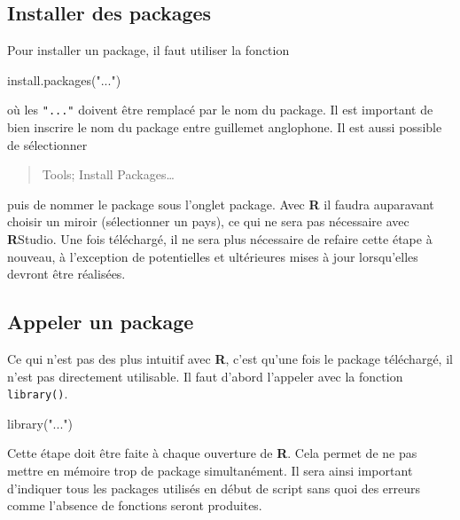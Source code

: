 \documentclass[
]{book}
\newenvironment{Shaded}{}{}
\newcommand{\FunctionTok}[1]{#1}
\newcommand{\NormalTok}[1]{#1}
\newcommand{\StringTok}[1]{#1}
\begin{document}
\hypertarget{installer-des-packages}{%
\subsection{Installer des packages}\label{installer-des-packages}}

Pour installer un package, il faut utiliser la fonction

\begin{Shaded}
\begin{Highlighting}[]
\FunctionTok{install.packages}\NormalTok{(}\StringTok{"..."}\NormalTok{)}
\end{Highlighting}
\end{Shaded}

où les \texttt{"..."} doivent être remplacé par le nom du package. Il est important de bien inscrire le nom du package entre guillemet anglophone. Il est aussi possible de sélectionner

\begin{quote}
Tools;
Install Packages\ldots{}
\end{quote}

puis de nommer le package sous l'onglet package. Avec \textbf{R} il faudra auparavant choisir un miroir (sélectionner un pays), ce qui ne sera pas nécessaire avec \textbf{R}Studio. Une fois téléchargé, il ne sera plus nécessaire de refaire cette étape à nouveau, à l'exception de potentielles et ultérieures mises à jour lorsqu'elles devront être réalisées.

\hypertarget{appeler-un-package}{%
\subsection{Appeler un package}\label{appeler-un-package}}

Ce qui n'est pas des plus intuitif avec \textbf{R}, c'est qu'une fois le package téléchargé, il n'est pas directement utilisable. Il faut d'abord l'appeler avec la fonction \texttt{library()}.

\begin{Shaded}
\begin{Highlighting}[]
\FunctionTok{library}\NormalTok{(}\StringTok{"..."}\NormalTok{)}
\end{Highlighting}
\end{Shaded}

Cette étape doit être faite à chaque ouverture de \textbf{R}. Cela permet de ne pas mettre en mémoire trop de package simultanément. Il sera ainsi important d'indiquer tous les packages utilisés en début de script sans quoi des erreurs comme l'absence de fonctions seront produites.
\end{document}
